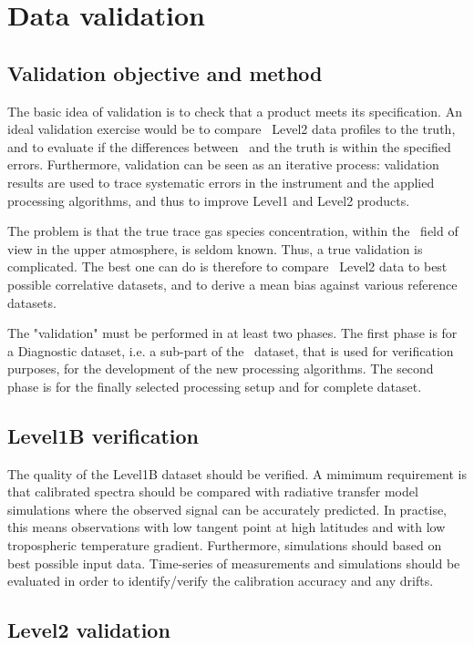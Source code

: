 \chapter{Data validation}


\section{Validation objective and method}

The basic idea of validation is to check that a product  
meets its specification. An ideal validation exercise
would be to compare \smr\ Level2 data profiles to the truth,
and to evaluate if the differences between \smr\ and the 
truth is within the specified errors. Furthermore, validation can 
be seen as an iterative process: validation results are used to 
trace systematic errors in the instrument and the applied 
processing algorithms, and thus to improve Level1 and Level2 products.

The problem is that the true trace gas species concentration,
within the \smr\ field of view in the upper atmosphere, is seldom known. 
Thus, a true validation is complicated. The best one can do is therefore
to compare \smr\ Level2 data to best possible correlative datasets,
and to derive a mean bias against various reference datasets.

The "validation" must be performed in at least two phases.
The first phase is for a Diagnostic dataset, i.e. a sub-part 
of the \smr\ dataset, that is used for verification purposes, 
for the development of the new processing algorithms.  
The second phase is for the finally selected processing setup
and for complete dataset.

\section{Level1B verification}

The quality of the Level1B dataset should be verified.
A mimimum requirement is that calibrated spectra should 
be compared with radiative transfer model simulations where 
the observed signal can be accurately predicted. 
In practise, this means observations with low tangent point 
at high latitudes and with low tropospheric temperature gradient. 
Furthermore, simulations should based on best possible input data.
Time-series of measurements and simulations should be evaluated
in order to identify/verify the calibration accuracy and any drifts. 


\section{Level2 validation}

